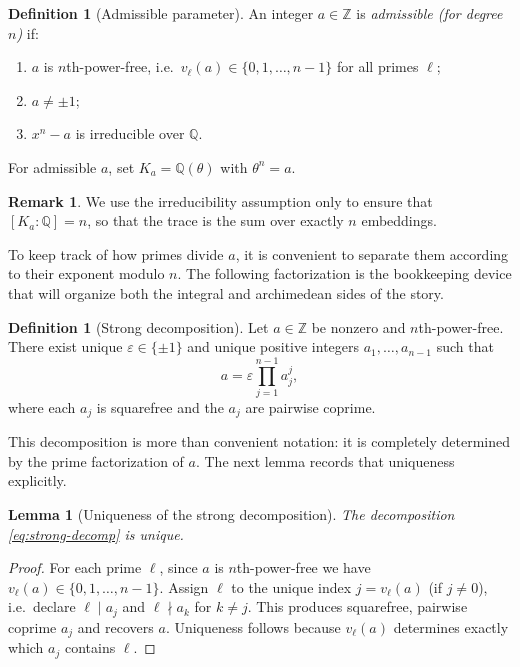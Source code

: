 \documentclass[11pt,letterpaper]{amsart}
\newcommand{\Q}{\mathbb{Q}}
\newcommand{\Z}{\mathbb{Z}}
\theoremstyle{plain}
\newtheorem{lemma}[theorem]{Lemma}
\theoremstyle{definition}
\newtheorem{definition}[theorem]{Definition}
\newtheorem{remark}[theorem]{Remark}
\begin{document}
\begin{definition}[Admissible parameter]\label{def:admissible}
An integer $a\in\Z$ is \emph{admissible (for degree $n$)} if:
\begin{enumerate}[label=(\arabic*),leftmargin=2.2em]
\item $a$ is $n$th-power-free, i.e.\ $v_\ell(a)\in\{0,1,\dots,n-1\}$ for all primes $\ell$;
\item $a\neq \pm1$;
\item $x^n-a$ is irreducible over $\Q$.
\end{enumerate}
For admissible $a$, set $K_a=\Q(\theta)$ with $\theta^n=a$.
\end{definition}

\begin{remark}
We use the irreducibility assumption only to ensure that $[K_a:\Q]=n$, so that the trace is the sum over exactly
$n$ embeddings.
\end{remark}

To keep track of how primes divide \(a\), it is convenient to separate them according to their exponent modulo \(n\). The following factorization is the bookkeeping device that will organize both the integral and archimedean sides of the story.

\begin{definition}[Strong decomposition]\label{def:strong-decomp}
Let $a\in\Z$ be nonzero and $n$th-power-free.
There exist unique $\varepsilon\in\{\pm1\}$ and unique positive integers $a_1,\dots,a_{n-1}$ such that
\begin{equation}\label{eq:strong-decomp}
a=\varepsilon\prod_{j=1}^{n-1} a_j^j,
\end{equation}
where each $a_j$ is squarefree and the $a_j$ are pairwise coprime.
\end{definition}

This decomposition is more than convenient notation: it is completely determined by the prime factorization of \(a\). The next lemma records that uniqueness explicitly.


\begin{lemma}[Uniqueness of the strong decomposition]\label{lem:strong-uniq}
The decomposition \eqref{eq:strong-decomp} is unique.
\end{lemma}

\begin{proof}
For each prime $\ell$, since $a$ is $n$th-power-free we have $v_\ell(a)\in\{0,1,\dots,n-1\}$.
Assign $\ell$ to the unique index $j=v_\ell(a)$ (if $j\neq 0$), i.e.\ declare $\ell\mid a_j$ and $\ell\nmid a_k$
for $k\neq j$.
This produces squarefree, pairwise coprime $a_j$ and recovers $a$.
Uniqueness follows because $v_\ell(a)$ determines exactly which $a_j$ contains $\ell$.
\end{proof}
\end{document}
